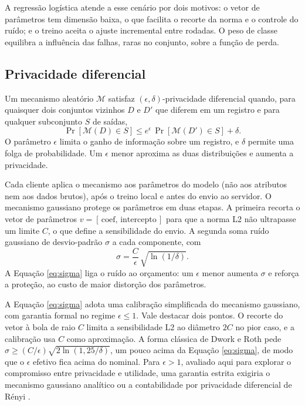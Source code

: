\documentclass[12pt]{article}
\begin{document}
A regressão logística atende a esse cenário por dois motivos: o vetor de parâmetros
tem dimensão baixa, o que facilita o recorte da norma e o controle do ruído; e o
treino aceita o ajuste incremental entre rodadas. O peso de classe equilibra a
influência das falhas, raras no conjunto, sobre a função de perda.

\subsection{Privacidade diferencial}

Um mecanismo aleatório $\mathcal{M}$ satisfaz $(\epsilon,\delta)$-privacidade
diferencial quando, para quaisquer dois conjuntos vizinhos $D$ e $D'$ que diferem em
um registro e para qualquer subconjunto $S$ de saídas,
\begin{equation}
\Pr[\mathcal{M}(D)\in S] \le e^{\epsilon}\,\Pr[\mathcal{M}(D')\in S] + \delta .
\label{eq:dp}
\end{equation}
O parâmetro $\epsilon$ limita o ganho de informação sobre um registro, e $\delta$
permite uma folga de probabilidade. Um $\epsilon$ menor aproxima as duas
distribuições e aumenta a privacidade.

Cada cliente aplica o mecanismo aos parâmetros do modelo (não aos atributos nem aos dados brutos), após o treino local e antes do envio ao servidor. O mecanismo gaussiano protege os parâmetros em duas etapas. A primeira recorta o
vetor de parâmetros $v=[\,\mathrm{coef},\,\mathrm{intercepto}\,]$ para que a norma L2
não ultrapasse um limite $C$, o que define a sensibilidade do envio. A segunda soma ruído
gaussiano de desvio-padrão $\sigma$ a cada componente, com
\begin{equation}
\sigma = \frac{C}{\epsilon}\,\sqrt{\ln(1/\delta)} .
\label{eq:sigma}
\end{equation}
A Equação \ref{eq:sigma} liga o ruído ao orçamento: um $\epsilon$ menor aumenta
$\sigma$ e reforça a proteção, ao custo de maior distorção dos parâmetros.

A Equação \ref{eq:sigma} adota uma calibração simplificada do mecanismo gaussiano, com
garantia formal no regime $\epsilon \le 1$. Vale destacar dois pontos. O recorte do
vetor à bola de raio $C$ limita a sensibilidade L2 ao diâmetro $2C$ no pior caso, e a
calibração usa $C$ como aproximação. A forma clássica de Dwork e Roth
\cite{dwork2014foundations} pede $\sigma \ge (C/\epsilon)\sqrt{2\ln(1{,}25/\delta)}$, um
pouco acima da Equação \ref{eq:sigma}, de modo que o $\epsilon$ efetivo fica acima do
nominal. Para $\epsilon > 1$, avaliado aqui para explorar o compromisso entre privacidade e
utilidade, uma garantia estrita exigiria o mecanismo gaussiano analítico
\cite{balle2018analytic} ou a contabilidade por privacidade diferencial de Rényi
\cite{mironov2017renyi}.
\end{document}
